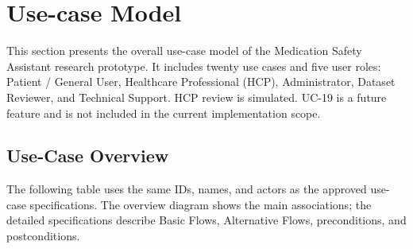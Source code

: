 %
%
\clearpage
\section{Use-case Model}
\label{sec:use-case-model}

This section presents the overall use-case model of the Medication Safety
Assistant research prototype. It includes twenty use cases and five user
roles: Patient / General User, Healthcare Professional (HCP), Administrator,
Dataset Reviewer, and Technical Support. HCP review is simulated.
UC-19 is a future feature and is not included in the current implementation
scope.

\subsection{Use-Case Overview}
\label{subsec:uc-overview-table}

The following table uses the same IDs, names, and actors as the approved
use-case specifications. The overview diagram shows the main associations;
the detailed specifications describe Basic Flows, Alternative Flows,
preconditions, and postconditions.


